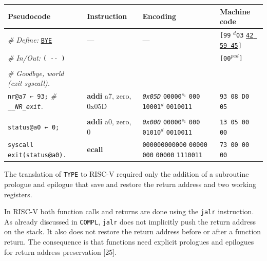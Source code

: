 \documentclass[a4paper,12pt,final]{article}
\makeatletter
\newcommand{\citeprocitem}[2]{\hyper@linkstart{cite}{citeproc_bib_item_#1}#2\hyper@linkend}
\makeatother
\begin{document}
\begin{table}[!htbp] \begin{adjustwidth}{-1cm}{-1cm} \fontsize{8}{9.600000}\selectfont
\begin{center}
\begin{tabular}{l|ll|l}
\textbf{Pseudocode} & \textbf{Instruction} & \textbf{Encoding} & \textbf{Machine code}\\[0pt]
\hline
\emph{\# Define:} \uline{\texttt{BYE}} & --- & --- & \texttt{[99} \(^{d}\)​\texttt{03} \uline{\texttt{42 59 45}}​\texttt{]}\\[0pt]
\emph{\# In/Out:} \texttt{( -​- )} &  &  & \texttt{[00}​\(^{pad}\)​\texttt{]}\\[0pt]
 &  &  & \\[0pt]
\emph{\# Goodbye, world (exit syscall).} &  &  & \\[0pt]
\texttt{nr@a7 ← 93;}  \emph{\# \texttt{\_\_NR\_exit}.} & \textbf{addi} a7, zero, 0x05D & \emph{\texttt{0x05D}}                    \texttt{00000}​\(^{s_{1}}\) \texttt{000} \texttt{10001}​\(^{d}\)  \texttt{0010011} & \texttt{93 08 D0 05}\\[0pt]
 &  &  & \\[0pt]
\texttt{status@a0 ← 0;} & \textbf{addi} a0, zero, 0 & \emph{\texttt{0x000}}                    \texttt{00000}​\(^{s_{1}}\) \texttt{000} \texttt{01010}​\(^{d}\)  \texttt{0010011} & \texttt{13 05 00 00}\\[0pt]
\texttt{syscall exit(status@a0).} & \textbf{ecall} & \texttt{000000000000}     \texttt{00000}                           \texttt{000} \texttt{00000}          \texttt{1110011} & \texttt{73 00 00 00}\\[0pt]
\end{tabular}

\end{center}
\normalsize \end{adjustwidth} \end{table} \vspace{0}

The translation of \texttt{TYPE} to RISC-V required only the addition of a
subroutine prologue and epilogue that save and restore the return
address and two working registers.

In RISC-V both function calls and returns are done using the \texttt{jalr}
instruction. As already discussed in \texttt{COMPL}, \texttt{jalr} does not
implicitly push the return address on the stack.  It also does not
restore the return address before or after a function return.  The
consequence is that functions need explicit prologues and epilogues
for return address preservation \citeprocitem{25}{[25]}.
\end{document}
